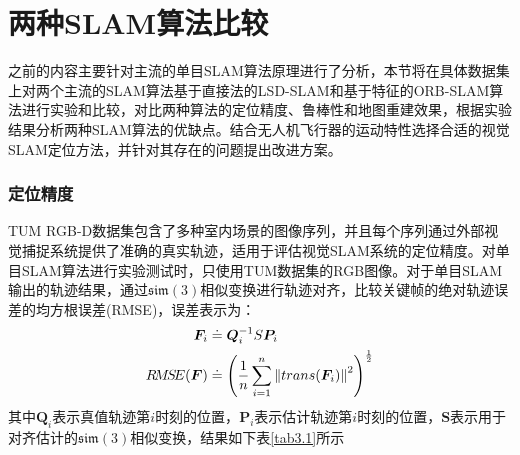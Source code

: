 \section{两种SLAM算法比较}
之前的内容主要针对主流的单目SLAM算法原理进行了分析，本节将在具体数据集上对两个主流的SLAM算法基于直接法的LSD-SLAM和基于特征的ORB-SLAM算法进行实验和比较，对比两种算法的定位精度、鲁棒性和地图重建效果，根据实验结果分析两种SLAM算法的优缺点。结合无人机飞行器的运动特性选择合适的视觉SLAM定位方法，并针对其存在的问题提出改进方案。

\subsubsection*{定位精度}
TUM RGB-D数据集包含了多种室内场景的图像序列，并且每个序列通过外部视觉捕捉系统提供了准确的真实轨迹，适用于评估视觉SLAM系统的定位精度。对单目SLAM算法进行实验测试时，只使用TUM数据集的RGB图像。对于单目SLAM输出的轨迹结果，通过$\mathfrak{sim}(3)$相似变换进行轨迹对齐，比较关键帧的绝对轨迹误差的均方根误差(RMSE)，误差表示为：
\begin{equation}
\label{equ3.23}
\begin{aligned}
\boldsymbol{F}_i &\doteq \boldsymbol{Q}_i^{-1} S \boldsymbol{P}_i
\\ 
R\!M\!S\!E(\boldsymbol{F}) &\doteq \left( {1 \over n} \sum\limits_{i=1}^n \left \Vert trans(\boldsymbol{F}_i) \right \Vert^2 \right)^{1 \over 2} 
\end{aligned}
\end{equation}
其中$\boldsymbol{Q}_i$表示真值轨迹第$i$时刻的位置，$\boldsymbol{P}_i$表示估计轨迹第$i$时刻的位置，$\boldsymbol{S}$表示用于对齐估计的$\mathfrak{sim}(3)$相似变换，结果如下表\ref{tab3.1}所示
